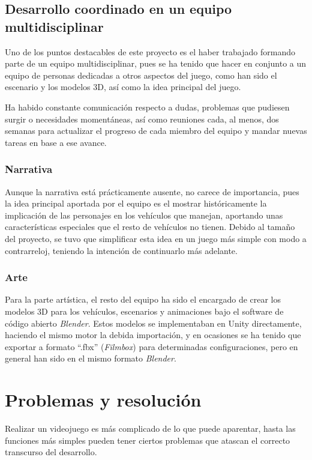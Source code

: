 \subsection{Desarrollo coordinado en un equipo multidisciplinar}

Uno de los puntos destacables de este proyecto es el haber trabajado formando parte de un equipo multidisciplinar, pues se ha tenido que hacer en conjunto a un equipo de personas dedicadas a otros aspectos del juego, como han sido el escenario y los modelos 3D, así como la idea principal del juego.

Ha habido constante comunicación respecto a dudas, problemas que pudiesen surgir o necesidades momentáneas, así como reuniones cada, al menos, dos semanas para actualizar el progreso de cada miembro del equipo y mandar nuevas tareas en base a ese avance.

\subsubsection{Narrativa}

Aunque la narrativa está prácticamente ausente, no carece de importancia, pues la idea principal aportada por el equipo es el mostrar históricamente la implicación de las personajes en los vehículos que manejan, aportando unas características especiales que el resto de vehículos no tienen. Debido al tamaño del proyecto, se tuvo que simplificar esta idea en un juego más simple con modo a contrarreloj, teniendo la intención de continuarlo más adelante.

\subsubsection{Arte}

Para la parte artística, el resto del equipo ha sido el encargado de crear los modelos 3D para los vehículos, escenarios y animaciones bajo el software de código abierto \textit{Blender}. Estos modelos se implementaban en Unity directamente, haciendo el mismo motor la debida importación, y en ocasiones se ha tenido que exportar a formato ``.fbx'' (\textit{Filmbox}) para determinadas configuraciones, pero en general han sido en el mismo formato \textit{Blender}.

\section{Problemas y resolución}

Realizar un videojuego es más complicado de lo que puede aparentar, hasta las funciones más simples pueden tener ciertos problemas que atascan el correcto transcurso del desarrollo.

